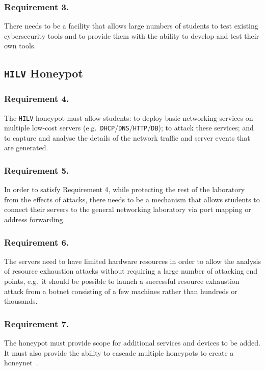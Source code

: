 \documentclass[10pt,journal]{IEEEtran}
\begin{document}
\subsubsection{Requirement 3.} 
There needs to be a facility that allows large numbers of students to test
existing cybersecurity tools and to provide them with the ability to develop
and test their own tools.

\subsection{\texttt{HILV} Honeypot}\label{subsec:ResearchHoneypot}

\subsubsection{Requirement 4.} 
The \texttt{HILV} honeypot must allow students: to deploy basic networking services
on multiple low-cost servers
(e.g.\ \texttt{DHCP}/\texttt{DNS}/\texttt{HTTP}/\texttt{DB}); to attack these
services; and to capture and analyse the details of the network traffic
and server events that are generated.

\subsubsection{Requirement 5.} 
In order to satisfy Requirement 4, while protecting the rest of the laboratory
from the effects of attacks, there needs to be a mechanism that allows students
to connect their servers to the general networking laboratory via port mapping
or address forwarding.

\subsubsection{Requirement 6.} 
The servers need to have limited hardware resources in order to allow the
analysis of resource exhaustion attacks without requiring a large number of
attacking end points, e.g.\ it should be possible to launch a successful
resource exhaustion attack from a botnet consisting of a few machines rather
than hundreds or thousands.

\subsubsection{Requirement 7.} 
The honeypot must provide scope for additional services and devices to be
added. It must also provide the ability to cascade multiple honeypots to create
a honeynet~\cite{AA:15,FDF:15,KNC:15}.
\end{document}

